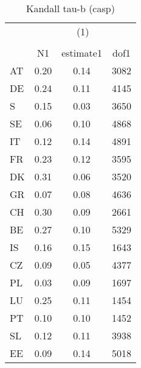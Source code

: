 \begin{table}[htbp]\centering
\def\sym#1{\ifmmode^{#1}\else\(^{#1}\)\fi}
\caption{Kandall tau-b (casp)}
\begin{tabular}{l*{1}{ccc}}
\hline\hline
                    &\multicolumn{3}{c}{(1)}               \\
                    &\multicolumn{3}{c}{}                  \\
                    &          N1&   estimate1&        dof1\\
\hline
AT                  &        0.20&        0.14&        3082\\
DE                  &        0.24&        0.11&        4145\\
S                   &        0.15&        0.03&        3650\\
SE                  &        0.06&        0.10&        4868\\
IT                  &        0.12&        0.14&        4891\\
FR                  &        0.23&        0.12&        3595\\
DK                  &        0.31&        0.06&        3520\\
GR                  &        0.07&        0.08&        4636\\
CH                  &        0.30&        0.09&        2661\\
BE                  &        0.27&        0.10&        5329\\
IS                  &        0.16&        0.15&        1643\\
CZ                  &        0.09&        0.05&        4377\\
PL                  &        0.03&        0.09&        1697\\
LU                  &        0.25&        0.11&        1454\\
PT                  &        0.10&        0.10&        1452\\
SL                  &        0.12&        0.11&        3938\\
EE                  &        0.09&        0.14&        5018\\
\hline\hline
\end{tabular}
\end{table}
